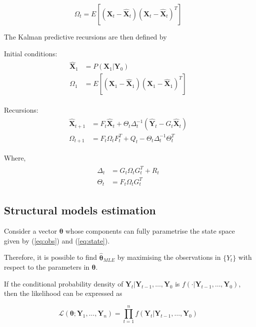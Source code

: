 \begin{equation}
	\Omega_t = E[(\bm{X}_t - \hat{\bm{X}}_t)(\bm{X}_t - \hat{\bm{X}}_t)^T]
\end{equation}

The Kalman predictive recursions are then defined by

Initial conditions:
\begin{align}\label{eq:kalm_pred_init}
	\begin{split}
		\hat{\bm{X}}_1 &= P(\bm{X}_1 | \bm{Y}_0) \\
		\Omega_1 &= E[(\bm{X}_1 - \hat{\bm{X}}_1)(\bm{X}_1 - \hat{\bm{X}}_1)^T]
	\end{split}
\end{align}

Recursions:
\begin{align}\label{eq:kalm_pred_1}
	\begin{split}
		\hat{\bm{X}}_{t+1} &= F_t\hat{\bm{X}}_t + \Theta_t\Delta_t^{-1}(\hat{\bm{Y}}_t - G_t\hat{\bm{X}}_t) \\
		\Omega_{t+1} &= F_t \Omega_t F_t^T + Q_t - \Theta_t \Delta_t^{-1} \Theta_t^T 
	\end{split}
\end{align}

Where,
\begin{align}\label{eq:kalm_pred_2}
	\begin{split}
		\Delta_t &= G_t \Omega_t G_t^T + R_t \\
		\Theta_t &= F_t \Omega_t G_t^T
	\end{split}
\end{align}

\subsection{Structural models estimation}

Consider a vector $\bm{\theta}$ whose components can fully parametrise the state space given by (\ref{eq:obs}) and (\ref{eq:state}).

Therefore, it is possible to find $\bm{\hat{\bm{\theta}}}_{MLE}$ by maximising the observations in $\{Y_t\}$ with respect to the parameters in $\bm{\theta}$.

If the conditional probability density of $\bm{Y}_t | \bm{Y}_{t-1}, \ldots, \bm{Y}_0$ is $f(\cdot | \bm{Y}_{t-1}, \ldots, \bm{Y}_0)$, then the likelihood can be expressed as 

\begin{equation}\label{eq:structts_lik_1}
	\mathcal{L}(\bm{\theta} ; \bm{Y}_1, \ldots, \bm{Y}_n) = \prod_{t=1}^{n}{f(\bm{Y}_t | \bm{Y}_{t-1}, \ldots, \bm{Y}_0)}
\end{equation}

